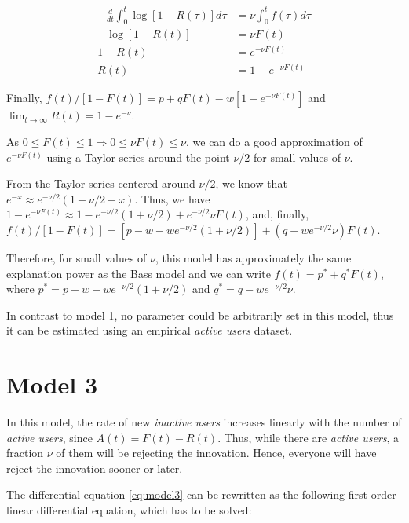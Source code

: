 \begin{align}
	- \frac{d}{dt} \int_0^t \log[1 - R(\tau)] d\tau &= \nu \int_0^t f(\tau) d\tau \\
	- \log[1 - R(t)] &= \nu F(t) \\
	1 - R(t) &= e^{-\nu F(t)} \\
	R(t) &= 1 - e^{-\nu F(t)}
\end{align}

Finally, $f(t) / [1 - F(t)] = p + qF(t) - w[1 - e^{-\nu F(t)}]$ and $\lim_{t \rightarrow \infty} R(t) = 1 - e^{-\nu}$.

As $0 \leq F(t) \leq 1 \Rightarrow 0 \leq \nu F(t) \leq \nu$, we can do a good approximation of $e^{-\nu F(t)}$ using a Taylor series around the point $\nu/2$ for small values of $\nu$.

From the Taylor series centered around $\nu/2$, we know that $e^{-x} \approx e^{-\nu/2} (1 + \nu/2 - x)$. Thus, we have $1 - e^{-\nu F(t)} \approx 1 - e^{-\nu/2} (1 + \nu/2) + e^{-\nu/2} \nu F(t)$, and, finally, $f(t) / [1 - F(t)] = [p - w - w e^{-\nu/2} (1 + \nu/2)] + (q - w e^{-\nu/2} \nu)F(t)$.

Therefore, for small values of $\nu$, this model has approximately the same explanation power as the Bass model and we can write $f(t) = p^* + q^*F(t)$, where $p^* = p-w-we^{-\nu/2}(1+\nu/2)$ and $q^* = q - we^{-\nu/2}\nu$.

In contrast to model 1, no parameter could be arbitrarily set in this model, thus it can be estimated using an empirical \textit{active users} dataset.




\section{Model 3}

In this model, the rate of new \textit{inactive users} increases linearly with the number of \textit{active users}, since $A(t) = F(t) - R(t)$. Thus, while there are \textit{active users}, a fraction $\nu$ of them will be rejecting the innovation. Hence, everyone will have reject the innovation sooner or later.

The differential equation \ref{eq:model3} can be rewritten as the following first order linear differential equation, which has to be solved:

